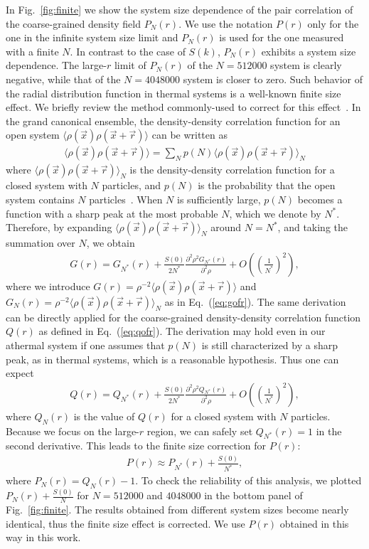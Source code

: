 \documentclass[aps,pre,twocolumn,superscriptaddress]{revtex4-1}
\newcommand{\ppdif}[2]{\frac{{\partial}^2 #1}{\partial^2 {#2}}}
\newcommand{\ave}[1]{\langle {#1} \rangle}
\begin{document}
In Fig.~\ref{fig:finite} we show the system size dependence of the
pair correlation of the coarse-grained density field $P_N(r)$. 
We use the notation $P(r)$ only for the one in the infinite system size 
limit and 
$P_N(r)$ is used for the one measured with a finite 
$N$. 
In contrast to the case of $S(k)$, 
$P_N(r)$ exhibits a system size dependence.
The large-$r$ limit of $P_N(r)$ of the $N=512000$ system 
is clearly negative, 
while that of the $N=4048000$ system is closer to zero. 
Such behavior of the radial distribution function in thermal systems 
is a well-known finite size effect. 
We briefly review the method commonly-used to correct 
for this effect~\cite{salacuse1996}. 
In the grand canonical ensemble, 
the density-density correlation function for an open system 
$\ave{\rho(\vec{x}) \rho (\vec{x}+\vec{r})}$ 
can be written as 
\begin{eqnarray}
\ave{\rho(\vec{x}) \rho (\vec{x}+\vec{r})} = 
\sum_{N} p(N) \ave{\rho(\vec{x}) \rho (\vec{x}+\vec{r})}_N
\end{eqnarray}
where $\ave{\rho(\vec{x}) \rho (\vec{x}+\vec{r})}_N$ 
is the  density-density correlation function for a closed system with 
$N$ particles, 
and $p(N)$ is the probability that the open system contains $N$ 
particles~\cite{hansen}.  
When $N$ is sufficiently large, 
$p(N)$ becomes a function with a sharp peak at the most probable $N$, 
which we denote by $N^*$. 
Therefore, by expanding $\ave{\rho(\vec{x}) \rho (\vec{x}+\vec{r})}_N$ 
around $N = N^*$, and taking the summation over $N$, 
we obtain 
\begin{eqnarray}
G(r) = G_{N^*}(r) 
+ \frac{S(0)}{2N^*} \ppdif{\rho^2 G_{N^*}(r)}{\rho} + O((\frac{1}{N^*})^2),
\end{eqnarray}
where we introduce $G(r) = \rho^{-2} \ave{\rho(\vec{x}) \rho (\vec{x}+\vec{r})}$
and $G_N(r) = \rho^{-2} \ave{\rho(\vec{x}) \rho (\vec{x}+\vec{r})}_N$ 
as in Eq.~(\ref{eq:gofr}). 
The same derivation can be directly applied for 
the coarse-grained density-density correlation function 
$Q(r)$ as defined in Eq.~(\ref{eq:qofr}). 
The derivation may hold even in our athermal system 
if one assumes that $p(N)$ 
is still characterized by a sharp peak, as in thermal systems, which
is a reasonable hypothesis. 
Thus one can expect 
\begin{eqnarray}
Q(r) = Q_{N^*}(r) 
+ \frac{S(0)}{2N^*} \ppdif{\rho^2 Q_{N^*}(r)}{\rho} + O((\frac{1}{N^*})^2),
\end{eqnarray}
where $Q_N(r)$ is the value of $Q(r)$ for a closed system with 
$N$ particles.
Because we focus on the large-$r$ region, 
we can safely set $Q_{N^*}(r) = 1$ in the second derivative.
This leads to the finite size correction for $P(r)$: 
\begin{eqnarray}
P(r) \approx P_{N^*}(r) + \frac{S(0)}{N^*}, 
\end{eqnarray}
where $P_N(r) = Q_N(r) -1$. 
To check the reliability of this analysis, 
we plotted $P_{N}(r) + \frac{S(0)}{N}$ for $N=512000$ and $4048000$ 
in the bottom panel of Fig.~\ref{fig:finite}. 
The results obtained from different system sizes 
become nearly identical, thus the finite size effect is corrected. 
We use $P(r)$ obtained in this way in this work. 
\end{document}
